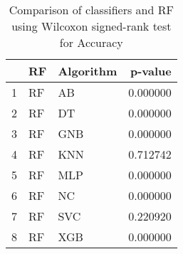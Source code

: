 \begin{table}
\footnotesize
\caption{Comparison of classifiers and RF using Wilcoxon signed-rank test for Accuracy}
\label{tab:RF wilcoxon Accuracy comparison}
\begin{tabular}{lllr}
\hline
 & RF & Algorithm & p-value \\
\hline
1 & RF & AB & 0.000000 \\
2 & RF & DT & 0.000000 \\
3 & RF & GNB & 0.000000 \\
4 & RF & KNN & 0.712742 \\
5 & RF & MLP & 0.000000 \\
6 & RF & NC & 0.000000 \\
7 & RF & SVC & 0.220920 \\
8 & RF & XGB & 0.000000 \\
\hline
\end{tabular}
\end{table}
